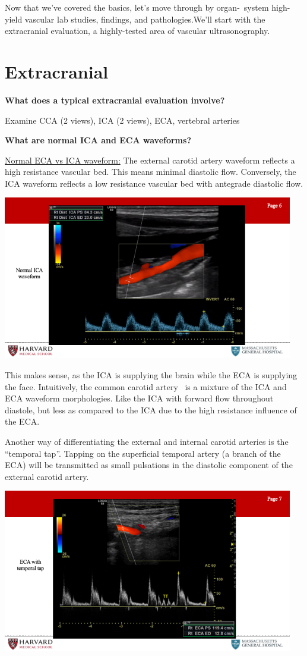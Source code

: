 \documentclass[
]{book}
\begin{document}
Now that we've covered the basics, let's move through by organ-~system
high-yield vascular lab studies, findings, and pathologies.We'll start
with the extracranial evaluation, a highly-tested area of vascular
ultrasonography.

\hypertarget{extracranial}{%
\section{Extracranial}\label{extracranial}}

\textbf{What does a typical extracranial evaluation involve?}

Examine CCA (2 views), ICA (2 views), ECA, vertebral arteries

\textbf{What are normal ICA and ECA waveforms?}

\underline{Normal ECA vs ICA waveform:} The external carotid artery waveform
reflects a high resistance vascular bed. This means minimal diastolic
flow. Conversely, the ICA waveform reflects a low resistance vascular
bed with antegrade diastolic flow.

\includegraphics[width=5in]{images/vasc_lab/Slide7}

This makes sense, as the ICA is supplying the brain while the ECA is
supplying the face. Intuitively, the common carotid artery~ is a mixture
of the ICA and ECA waveform morphologies. Like the ICA with forward flow
throughout diastole, but less as compared to the ICA due to the high
resistance influence of the ECA.

Another way of differentiating the external and internal carotid
arteries is the ``temporal tap''. Tapping on the superficial temporal
artery (a branch of the ECA) will be transmitted as small pulsations in
the diastolic component of the external carotid artery.

\includegraphics[width=5in]{images/vasc_lab/Slide8}
\end{document}
